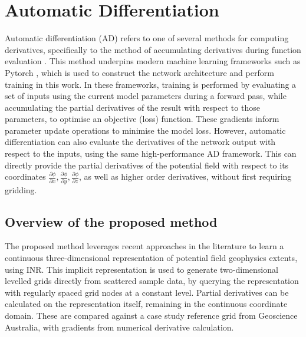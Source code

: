 \documentclass[manuscript.tex]{subfiles}
\begin{document}
\section{Automatic Differentiation}
Automatic differentiation (AD) refers to one of several methods for computing derivatives, specifically to the method of accumulating derivatives during function evaluation \parencite{baydinAutomaticDifferentiationMachine2018}.
This method underpins modern machine learning frameworks such as Pytorch \parencite{paszkePyTorchImperativeStyle2019}, which is used to construct the network architecture and perform training in this work.
In these frameworks, training is performed by evaluating a set of inputs using the current model parameters during a forward pass, while accumulating the partial derivatives of the result with respect to those parameters, to optimise an objective (loss) function.
These gradients inform parameter update operations to minimise the model loss.
However, automatic differentiation can also evaluate the derivatives of the network output with respect to the inputs, using the same high-performance AD framework.
This can directly provide the partial derivatives of the potential field with respect to its coordinates \(\frac{\partial\phi{}}{\partial x}, \frac{\partial \phi{}}{\partial y}, \frac{\partial \phi{}}{\partial z}\), as well as higher order derivatives, without first requiring gridding.

\subsection{Overview of the proposed method}
\label{sec:overview}
The proposed method leverages recent approaches in the literature to learn a continuous three-dimensional representation of potential field geophysics extents, using INR\@.
This implicit representation is used to generate two-dimensional levelled grids directly from scattered sample data, by querying the representation with regularly spaced grid nodes at a constant level.
Partial derivatives can be calculated on the representation itself, remaining in the continuous coordinate domain.
These are compared against a case study reference grid from Geoscience Australia, with gradients from numerical derivative calculation.

\end{document}
